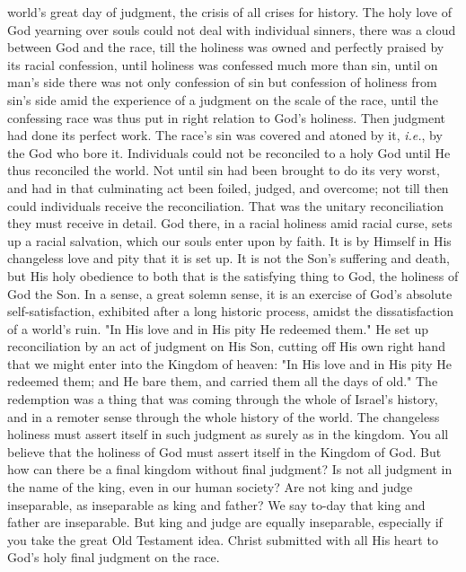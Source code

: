 \documentclass[draft]{ptfdoc}
\begin{document}
world's great day of judgment, the crisis of all 
crises for history. The holy love of God yearning 
over souls could not deal with individual 
sinners, there was a cloud between God and the 
race, till the holiness was owned and perfectly 
praised by its racial confession, until holiness 
was confessed much more than sin, until on 
man's side there was not only confession of 
sin but confession of holiness from sin's side 
amid the experience of a judgment on the 
scale of the race, until the confessing race 
was thus put in right relation to God's holiness. 
Then judgment had done its perfect 
work. The race's sin was covered and atoned 
by it, \textit{i.e.}, by the God who bore it. Individuals 
could not be reconciled to a holy God until 
He thus reconciled the world. Not until sin had 
been brought to do its very worst, and had in 
that culminating act been foiled, judged, and 
overcome; not till then could individuals receive 
the reconciliation. That was the unitary reconciliation 
they must receive in detail. God there, 
in a racial holiness amid racial curse, sets 
up a racial salvation, which our souls enter 
upon by faith. It is by Himself in His changeless 
love and pity that it is set up. It is not the 
Son's suffering and death, but His holy obedience 
to both that is the satisfying thing to God, the 
holiness of God the Son. In a sense, a great 
solemn sense, it is an exercise of God's absolute 
self-satisfaction, exhibited after a long historic 
process, amidst the dissatisfaction of a world's 
ruin. "In His love and in His pity He redeemed 
them." He set up reconciliation by an act of 
judgment on His Son, cutting off His own right 
hand that we might enter into the Kingdom 
of heaven: "In His love and in His pity He 
redeemed them; and He bare them, and carried 
them all the days of old." The redemption was 
a thing that was coming through the whole of 
Israel's history, and in a remoter sense through 
the whole history of the world. The changeless 
holiness must assert itself in such judgment as 
surely as in the kingdom. You all believe that 
the holiness of God must assert itself in the 
Kingdom of God. But how can there be a final 
kingdom without final judgment? Is not all 
judgment in the name of the king, even in our 
human society? Are not king and judge inseparable, 
as inseparable as king and father? 
We say to-day that king and father are inseparable. 
But king and judge are equally 
inseparable, especially if you take the great Old 
Testament idea. Christ submitted with all His 
heart to God's holy final judgment on the race. 
\end{document}
